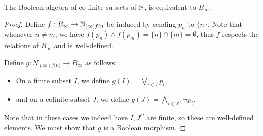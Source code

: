 \begin{lemma}\label{N-co-fin-cp}
  The Boolean algebra of co-finite subsets of $\mathbb{N}$, 
  is equivalent to $B_\infty$. 
\end{lemma}
\begin{proof}
%
%

  Define $f:B_\infty \to \mathbb{N}_{(co)fin}$ be induced by sending $p_n$ to $\{n\}$. 
  Note that whenever $n\neq m$, we have 
  $f(p_n)\wedge f(p_m) = \{n\} \cap \{m\} = \emptyset$, 
  thus $f$ respects the relations of $B_\infty$ and is well-defined.

  Define $g:N_{(co)fin)} \to B_\infty$ as follows:
  \begin{itemize}
    \item On a finite subset $I$, we define $g(I) = \bigvee_{i\in I} p_i$, 
    \item and on a cofinite subset $J$, we define $g(J) = \bigwedge _{i \in J^C} \neg p_i$. 
  \end{itemize}
  Note that in these cases we indeed have $I,J^C$ are finite, so these are well-defined elements. 
  We must show that $g$ is a Boolean morphism. 


\end{proof}
